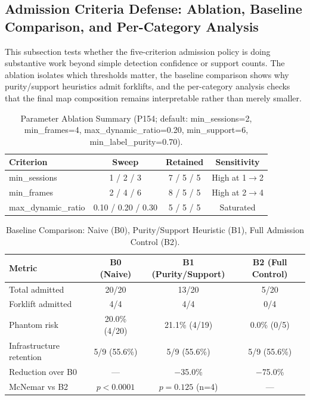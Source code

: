 \documentclass[journal]{IEEEtran}
\begin{document}
\subsection{Admission Criteria Defense: Ablation, Baseline Comparison, and Per-Category Analysis}
\label{sec:results_defense}

This subsection tests whether the five-criterion admission policy is doing substantive work beyond simple detection confidence or support counts. The ablation isolates which thresholds matter, the baseline comparison shows why purity/support heuristics admit forklifts, and the per-category analysis checks that the final map composition remains interpretable rather than merely smaller.

\begin{table}[t]
  \centering
  \caption{Parameter Ablation Summary (P154; default: min\_sessions=2, min\_frames=4, max\_dynamic\_ratio=0.20, min\_support=6, min\_label\_purity=0.70).}
  \label{tab:ablation}
  \begin{tabular}{lccc}
    \toprule
    Criterion & Sweep & Retained & Sensitivity \\
    \midrule
    min\_sessions & 1 / 2 / 3 & 7 / 5 / 5 & High at 1$\rightarrow$2 \\
    min\_frames & 2 / 4 / 6 & 8 / 5 / 5 & High at 2$\rightarrow$4 \\
    max\_dynamic\_ratio & 0.10 / 0.20 / 0.30 & 5 / 5 / 5 & Saturated \\
    \bottomrule
  \end{tabular}
\end{table}

\begin{table}[t]
  \centering
  \caption{Baseline Comparison: Naive (B0), Purity/Support Heuristic (B1), Full Admission Control (B2).}
  \label{tab:baseline_comparison}
  \begin{tabular}{lccc}
    \toprule
    Metric & B0 (Naive) & B1 (Purity/Support) & B2 (Full Control) \\
    \midrule
    Total admitted & 20/20 & 13/20 & 5/20 \\
    Forklift admitted & 4/4 & 4/4 & 0/4 \\
    Phantom risk & 20.0\% (4/20) & 21.1\% (4/19) & 0.0\% (0/5) \\
    Infrastructure retention & 5/9 (55.6\%) & 5/9 (55.6\%) & 5/9 (55.6\%) \\
    Reduction over B0 & --- & $-$35.0\% & $-$75.0\% \\
    \midrule
    McNemar vs B2 & $p{<}0.0001$ & $p{=}0.125$ (n=4) & --- \\
    \bottomrule
  \end{tabular}
\end{table}
\end{document}
